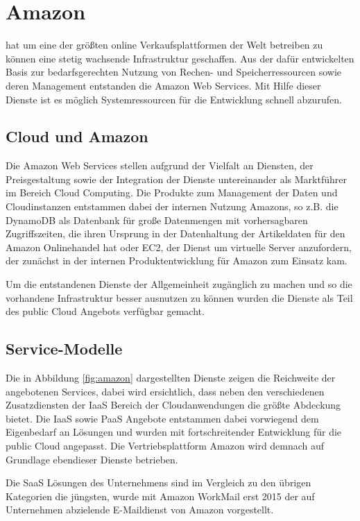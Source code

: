 \section{Amazon}
\label{sec_amazon}

 hat um eine der größten online Verkaufsplattformen der Welt betreiben zu können eine stetig wachsende Infrastruktur geschaffen. Aus der dafür entwickelten Basis zur bedarfsgerechten Nutzung von Rechen- und Speicherressourcen sowie deren Management entstanden die Amazon Web Services. Mit Hilfe dieser Dienste ist es möglich Systemressourcen für die Entwicklung schnell abzurufen.

\subsection{Cloud und Amazon}
\label{sec_amazon_general}
Die Amazon Web Services stellen aufgrund der Vielfalt an Diensten, der Preisgestaltung sowie der Integration der Dienste untereinander als Marktführer im Bereich Cloud Computing. Die Produkte zum Management der Daten und Cloudinstanzen entstammen dabei der internen Nutzung Amazons, so z.B. die DynamoDB als Datenbank für große Datenmengen mit vorhersagbaren Zugriffszeiten, die ihren Ursprung in der Datenhaltung der Artikeldaten für den Amazon Onlinehandel hat oder EC2, der Dienst um virtuelle Server anzufordern, der zunächst in der internen Produktentwicklung für Amazon zum Einsatz kam.

Um die entstandenen Dienste der Allgemeinheit zugänglich zu machen und so die vorhandene Infrastruktur besser ausnutzen zu können wurden die Dienste als Teil des public Cloud Angebots verfügbar gemacht.

\subsection{Service-Modelle}
\label{sec_amazon_delivery}
Die in Abbildung \ref{fig:amazon} dargestellten Dienste zeigen die Reichweite der angebotenen Services, dabei wird ersichtlich, dass neben den verschiedenen Zusatzdiensten der IaaS Bereich der Cloudanwendungen die größte Abdeckung bietet. Die IaaS sowie PaaS Angebote entstammen dabei vorwiegend dem Eigenbedarf an Lösungen und wurden mit fortschreitender Entwicklung für die public Cloud angepasst. Die Vertriebsplattform Amazon wird demnach auf Grundlage ebendieser Dienste betrieben.

Die SaaS Lösungen des Unternehmens sind im Vergleich zu den übrigen Kategorien die jüngsten, wurde mit Amazon WorkMail erst 2015 der auf Unternehmen abzielende E-Maildienst von Amazon vorgestellt.

